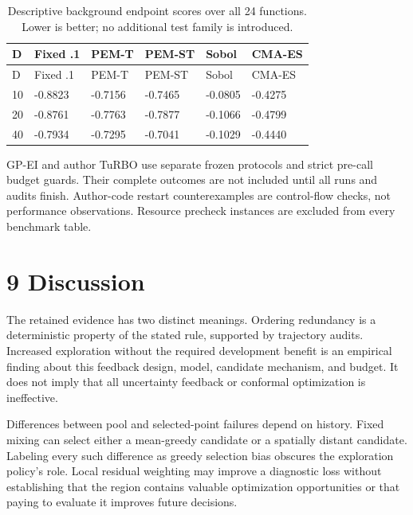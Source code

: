 \documentclass[11pt,a4paper]{article}
\begin{document}
\par\noindent\begin{minipage}{\linewidth}

\begin{longtable}[]{@{}llllll@{}}
\caption{Descriptive background endpoint scores over all 24 functions.
Lower is better; no additional test family is
introduced.}\tabularnewline
\toprule
D & Fixed .1 & PEM-T & PEM-ST & Sobol & CMA-ES \\
\midrule
\endfirsthead
\toprule
D & Fixed .1 & PEM-T & PEM-ST & Sobol & CMA-ES \\
\midrule
\endhead
10 & -0.8823 & -0.7156 & -0.7465 & -0.0805 & -0.4275 \\
20 & -0.8761 & -0.7763 & -0.7877 & -0.1066 & -0.4799 \\
40 & -0.7934 & -0.7295 & -0.7041 & -0.1029 & -0.4440 \\
\bottomrule
\end{longtable}

\end{minipage}\par

GP-EI and author TuRBO use separate frozen protocols and strict pre-call
budget guards. Their complete outcomes are not included until all runs
and audits finish. Author-code restart counterexamples are control-flow
checks, not performance observations. Resource precheck instances are
excluded from every benchmark table.

\hypertarget{discussion}{%
\section{9 Discussion}\label{discussion}}

The retained evidence has two distinct meanings. Ordering redundancy is
a deterministic property of the stated rule, supported by trajectory
audits. Increased exploration without the required development benefit
is an empirical finding about this feedback design, model, candidate
mechanism, and budget. It does not imply that all uncertainty feedback
or conformal optimization is ineffective.

Differences between pool and selected-point failures depend on history.
Fixed mixing can select either a mean-greedy candidate or a spatially
distant candidate. Labeling every such difference as greedy selection
bias obscures the exploration policy's role. Local residual weighting
may improve a diagnostic loss without establishing that the region
contains valuable optimization opportunities or that paying to evaluate
it improves future decisions.
\end{document}

